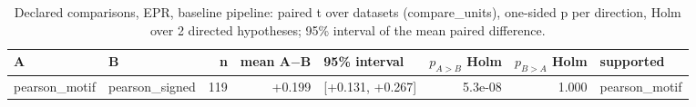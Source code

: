 \begin{table}[H]\centering\small
\caption{Declared comparisons, EPR, baseline pipeline: paired t over datasets (compare\_units), one-sided p per direction, Holm over 2 directed hypotheses; 95\% interval of the mean paired difference.}
\begin{tabular}{llrrlrrl}\toprule
A & B & n & mean A$-$B & 95\% interval & $p_{A>B}$ Holm & $p_{B>A}$ Holm & supported \\ \midrule
pearson\_motif & pearson\_signed & 119 & +0.199 & [+0.131, +0.267] & 5.3e-08 & 1.000 & pearson\_motif \\
\bottomrule\end{tabular}\end{table}

